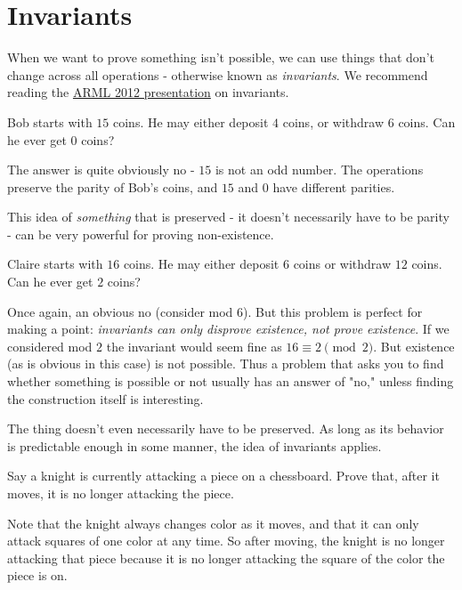 \section{Invariants}
When we want to prove something isn't possible, we can use things that don't change across all operations - otherwise known as \textit{invariants}. We recommend reading the \href{https://www.math.cmu.edu/~mlavrov/arml/12-13/invariants-12-09-12.pdf}{ARML 2012 presentation} on invariants.

\begin{exam}[Parity]
Bob starts with $15$ coins. He may either deposit $4$ coins, or withdraw $6$ coins. Can he ever get $0$ coins?
\end{exam}

\begin{sol}The answer is quite obviously no - $15$ is not an odd number. The operations preserve the parity of Bob's coins, and $15$ and $0$ have different parities.\end{sol}

This idea of \textit{something} that is preserved - it doesn't necessarily have to be parity - can be very powerful for proving non-existence.

\begin{exam}
Claire starts with $16$ coins. He may either deposit $6$ coins or withdraw $12$ coins. Can he ever get $2$ coins?
\end{exam}

Once again, an obvious no (consider mod $6$). But this problem is perfect for making a point: \textit{invariants can only disprove existence, not prove existence}. If we considered mod $2$ the invariant would seem fine as $16\equiv 2\pmod {2}.$ But existence (as is obvious in this case) is not possible. Thus a problem that asks you to find whether something is possible or not usually has an answer of "no," unless finding the construction itself is interesting.

The thing doesn't even necessarily have to be preserved. As long as its behavior is predictable enough in some manner, the idea of invariants applies.

\begin{exam}
Say a knight is currently attacking a piece on a chessboard. Prove that, after it moves, it is no longer attacking the piece.
\end{exam}

\begin{sol}
Note that the knight always changes color as it moves, and that it can only attack squares of one color at any time. So after moving, the knight is no longer attacking that piece because it is no longer attacking the square of the color the piece is on.
\end{sol}

